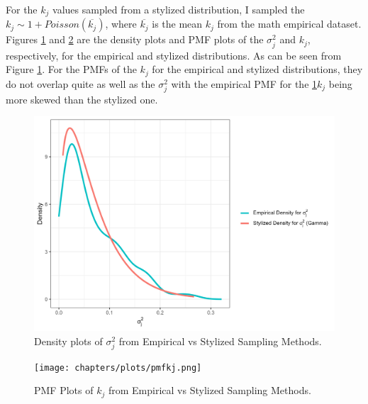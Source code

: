 
For the $k_j$ values sampled from a stylized distribution, I sampled the $k_j \sim 1+Poisson(\overline{k_j})$, where  $\overline{k_j}$ is the mean $k_j$ from the math empirical dataset. Figures \ref{fig:densitysigma_sq} and \ref{fig:pmfkj} are the density plots and PMF plots of the $\sigma_j^2$ and $k_j$, respectively, for the empirical and stylized distributions. As can be seen from Figure \ref{fig:densitysigma_sq}. For the PMFs of the $k_j$ for the empirical and stylized distributions, they do not overlap quite as well as the $\sigma_j^2$ with the empirical PMF for the \ref{fig:densitysigma_sq}$k_j$ being more skewed than the stylized one.

\begin{figure}[H]
    \centering
    \vspace{-5pt}
    \includegraphics[width=\linewidth]{chapters/plots/densitysigma_j_sq.png}
    \caption{Density plots of $\sigma_j^2$ from Empirical vs Stylized Sampling Methods. \label{fig:densitysigma_sq}}
    \vspace{-5pt}
\end{figure}

\begin{figure}[H]
    \centering
    \vspace{-5pt}
    \texttt{[image: chapters/plots/pmfkj.png]}
    \caption{PMF Plots of $k_j$ from Empirical vs Stylized Sampling Methods. \label{fig:pmfkj}}
    \vspace{-5pt}
\end{figure}

